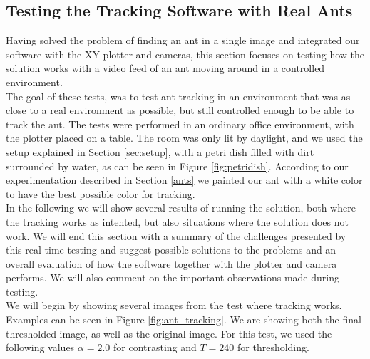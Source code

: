 
% 
% 


\subsection{Testing the Tracking Software with Real Ants}
\label{testing}

Having solved the problem of finding an ant in a single image and integrated our software with the XY-plotter and cameras, this section focuses on testing how the solution works with a video feed of an ant moving around in a controlled environment.\\

The goal of these tests, was to test ant tracking in an environment that was as close to a real environment as possible, but still controlled enough to be able to track the ant. The tests were performed in an ordinary office environment, with the plotter placed on a table. The room was only lit by daylight, and we used the setup explained in Section \ref{sec:setup}, with a petri dish filled with dirt surrounded by water, as can be seen in Figure \ref{fig:petridish}. According to our experimentation described in Section \ref{ants} we painted our ant with a white color to have the best possible color for tracking. \\

In the following we will show several results of running the solution, both where the tracking works as intented, but also situations where the solution does not work. We will end this section with a summary of the challenges presented by this real time testing and suggest possible solutions to the problems and an overall evaluation of how the software together with the plotter and camera performs. We will also comment on the important observations made during testing.\\

We will begin by showing several images from the test where tracking works. Examples can be seen in Figure \ref{fig:ant_tracking}. We are showing both the final thresholded image, as well as the original image. For this test, we used the following values $\alpha = 2.0$ for contrasting and $T = 240$ for thresholding.\\

